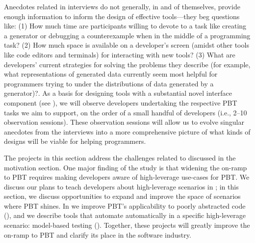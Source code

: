 %
Anecdotes related in interviews do not generally, in and of
themselves, provide enough information to inform the design of
effective tools---they beg questions like: (1) How much time
are participants willing to devote to
a task like creating a generator or debugging a counterexample when in the
middle of a programming task? (2) How much space is available on a developer's
screen (amidst other tools like code editors and terminals) for
interacting with new
tools? (3) What are developers' current strategies for solving the
problems they describe
(for example, what representations of generated data currently seem most helpful
for programmers trying to under the distributions of data generated by a
generator)?.  As a basis for designing tools with a substantial novel interface
component (see ), we will observe developers
undertaking the respective PBT tasks we
aim to support, on the order of a small handful of developers (i.e., 2--10
observation sessions). These observation sessions will allow us to evolve
singular anecdotes from the interviews into a more comprehensive picture of
what kinds of designs will be viable for helping programmers.


The projects in this section address the challenges related to
 discussed in the motivation section. One major finding
of the study is that widening the on-ramp to PBT requires making developers
aware of high-leverage use-cases for PBT. We discuss our plans to teach developers
about high-leverage scenarios in ; in this section, we
discuss opportunities to expand and improve the space of scenarios where PBT
shines.  In we improve PBT's applicability to poorly abstracted code
(), and we describe tools that automate
automatically in a specific high-leverage scenario: model-based testing
().  Together, these projects will greatly improve
the on-ramp to PBT and clarify its place in the software industry.

